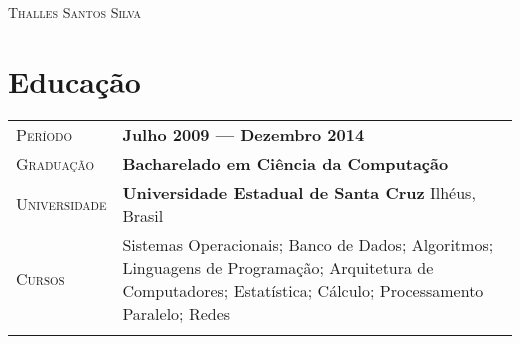 \documentclass[a4paper, oneside, final]{scrartcl} %
\newcommand{\gray}{\rowcolor[gray]{.90}} %
\begin{document}
\begin{center} %


{\fontsize{36}{36}\selectfont\scshape Thalles Santos Silva} %

\vspace{1.5cm} %


%


\section{Educação}

\begin{tabularx}{0.97\linewidth}{>{\raggedleft\scshape}p{2.34cm}X}
\gray Período & \textbf{Julho 2009 --- Dezembro 2014}\\
\gray Graduação & \textbf{Bacharelado em Ciência da Computação}\\
\gray Universidade & \textbf{Universidade Estadual de Santa Cruz} \hfill Ilhéus, Brasil\\
Cursos & Sistemas Operacionais; Banco de Dados; Algoritmos; Linguagens de Programação; Arquitetura de Computadores; Estatística; Cálculo; Processamento Paralelo; Redes\\
& 
\end{tabularx}

\vspace{12pt}


\end{center}
\end{document}
